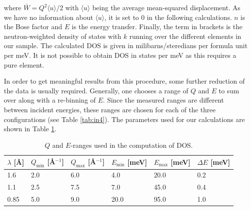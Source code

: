  \noindent where $\bar{W} = Q^2 \langle u \rangle / 2$ with $\langle u \rangle$ being the average mean-squared displacement. As we have no information about $\langle u \rangle$, it is set to 0 in the following calculations. $n$ is the Bose factor and $E$ is the energy transfer. Finally, the term in brackets is the neutron-weighted density of states with $k$ running over the different elements in our sample. The calculated DOS is given in milibarns/steredians per formula unit per meV. It is not possible to obtain DOS in states per meV as this requires a pure element.
 
 In order to get meaningful results from this procedure, some further reduction of the data is usually required. Generally, one chooses a range of $Q$ and $E$ to sum over along with a re-binning of $E$. Since the measured ranges are different between incident energies, these ranges are chosen for each of the three configurations (see Table \ref{tab:in4}). The parameters used for our calculations are shown in Table \ref{tab:qeranges}.
 
\begin{table}[b]
 \centering
\begin{tabular}{llllll}
\toprule
$\lambda$ [\AA] & $Q_\text{min}$ [\AA$^{-1}$] & $Q_\text{max}$ [\AA$^{-1}$] & $E_\text{min}$ [meV] & $E_\text{max}$ [meV] & $\Delta E$ [meV] \\ \midrule
1.6             & 2.0                         & 6.0                         & 4.0                  & 20.0                 & 0.2              \\
1.1             & 2.5                         & 7.5                         & 7.0                  & 45.0                 & 0.4              \\
0.85            & 5.0                         & 9.0                         & 20.0                 & 95.0                 & 1.0              \\ \bottomrule
\end{tabular}
 \caption[IN4: $Q$ and $E$ windows for DOS integration]{$Q$ and $E$-ranges used in the computation of DOS.}
 \label{tab:qeranges}
\end{table}

